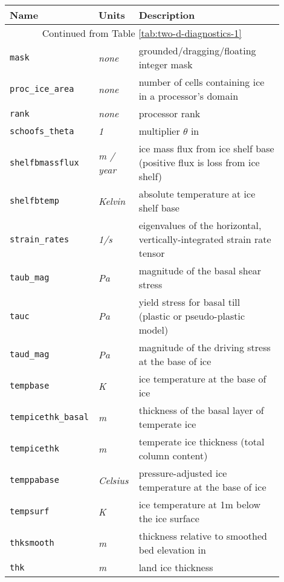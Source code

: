 \begin{table}[ht]
  \centering
  \begin{tabular}{p{0.15\linewidth}p{0.15\linewidth}p{0.6\linewidth}}
    \toprule
    \textbf{Name} & \textbf{Units} & \textbf{Description} \\
    \midrule
    \multicolumn{3}{c}{Continued from Table \ref{tab:two-d-diagnostics-1}}\\
    \texttt{mask} & \textsl{none} & grounded/dragging/floating integer mask \\
    \texttt{proc_ice_area} & \textsl{none} &  number of cells containing ice in a processor's domain \\
    \texttt{rank} & \textsl{none} &  processor rank \\
    \texttt{schoofs_theta} & \textsl{1} &  multiplier $\theta$ in \cite{Schoofbasaltopg2003} \\
    \texttt{shelfbmassflux} & \textsl{m / year} & ice mass flux from ice shelf base (positive flux is loss from ice shelf) \\
    \texttt{shelfbtemp} & \textsl{Kelvin} & absolute temperature at ice shelf base \\
    \texttt{strain_rates} & \textsl{1/s} & eigenvalues of the horizontal, vertically-integrated strain rate tensor \\
    \texttt{taub_mag} & \textsl{Pa} & magnitude of the basal shear stress \\
    \texttt{tauc} & \textsl{Pa} & yield stress for basal till (plastic or pseudo-plastic model) \\
    \texttt{taud_mag} & \textsl{Pa} &  magnitude of the driving stress at the base of ice \\
    \texttt{tempbase} & \textsl{K} &  ice temperature at the base of ice \\
    \texttt{tempicethk_basal} & \textsl{m} &  thickness of the basal layer of temperate ice \\
    \texttt{tempicethk} & \textsl{m} &  temperate ice thickness (total column content) \\
    \texttt{temppabase} & \textsl{Celsius} &  pressure-adjusted ice temperature at the base of ice \\
    \texttt{tempsurf} & \textsl{K} &  ice temperature at 1m below the ice surface \\
    \texttt{thksmooth} & \textsl{m} &  thickness relative to smoothed bed elevation in \cite{Schoofbasaltopg2003} \\
    \texttt{thk} & \textsl{m} & land ice thickness \\

\end{tabular}
\end{table}
